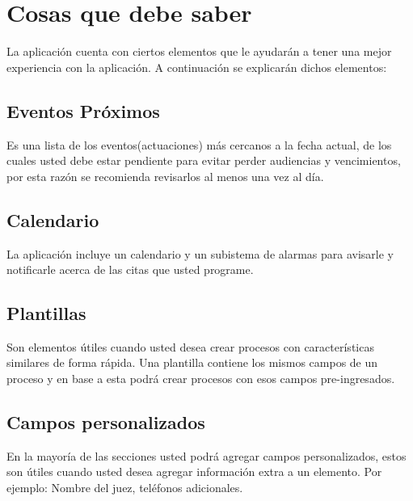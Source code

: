 \section{Cosas que debe saber}
La aplicaci\'on cuenta con ciertos elementos que le ayudar\'an a tener una
mejor experiencia con la aplicaci\'on. A continuaci\'on se explicar\'an dichos elementos:

\subsection{Eventos Pr\'oximos}
Es una lista de los eventos(actuaciones) m\'as cercanos a la fecha actual, de los cuales usted debe estar pendiente para evitar perder audiencias y vencimientos, por esta raz\'on se recomienda revisarlos al menos una vez al d\'ia.

\subsection{Calendario}
La aplicaci\'on incluye un calendario y un subistema de alarmas para avisarle y notificarle acerca de las citas que usted programe.

\subsection{Plantillas}
Son elementos \'utiles cuando usted desea crear procesos con
caracter\'isticas similares de forma r\'apida. Una plantilla contiene los mismos
campos de un proceso y en base a esta podr\'a crear procesos con esos campos
pre-ingresados.

\subsection{Campos personalizados}
En la mayor\'ia de las secciones usted podr\'a agregar campos personalizados, estos son
\'utiles cuando usted desea agregar informaci\'on extra a un elemento. Por
ejemplo: Nombre del juez, tel\'efonos adicionales.
